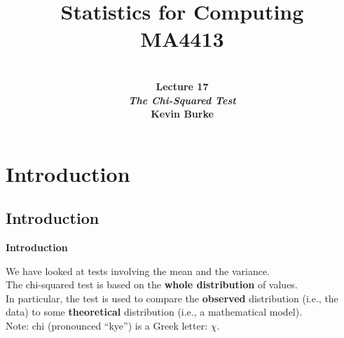 \documentclass[compress]{beamer}        %
\title{{\huge Statistics for Computing\\[0.1cm]MA4413}}
\author[Kevin Burke]{{\bf\\[0.5cm]{\huge Lecture 17}\\[0.2cm]\emph{The Chi-Squared Test}\\[1.4cm]Kevin Burke}\\[0.3cm]\tcb{kevin.burke@ul.ie}}
\institute[University of Limerick, Maths \& Stats Dept]{}
\date{}
\makeatletter
\newcommand{\tcb}{\textcolor{beamer@blendedblue}}
\makeatother
\begin{document}
\begin{frame}[t]
\titlepage
\end{frame}


\section{Introduction}
\subsection{Introduction}
\begin{frame}{\bf \tcb{Introduction}}

We have looked at tests involving the mean and the variance.\\[1.2cm]

The chi-squared test is based on the {\bf whole distribution} of values.\\[1.2cm]

In particular, the test is used to compare the {\bf observed} distribution (i.e., the data) to some {\bf theoretical} distribution (i.e., a mathematical model).\\[1.2cm]

Note: chi (pronounced ``kye'') is a Greek letter: $\chi$.




\end{frame}
\end{document}
